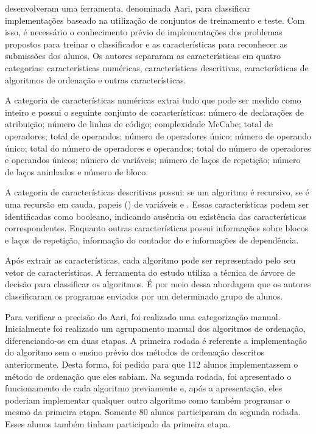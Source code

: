 		 desenvolveram uma ferramenta, denominada Aari,
		para classificar implementações baseado na utilização de conjuntos de treinamento
		e teste. Com isso, é necessário o conhecimento prévio de implementações dos
		problemas propostos para treinar o classificador e as características para
		reconhecer as submissões dos alunos. Os autores separaram as características
		em quatro categorias: características numéricas, características descritivas,
		características de algoritmos de ordenação e outras características.
		
		
		A categoria de características numéricas extrai tudo que pode ser medido
		como inteiro e possui o seguinte conjunto de características: número de
		declarações de atribuição; número de linhas de código; complexidade McCabe;
		total de operadores; total de operandos; número de operadores único; número
		de operando único; total do número de operadores e operandos; total do número
		de operadores e operandos únicos; número de variáveis; número de laços de
		repetição; número de laços aninhados e número de bloco.
		
		A categoria de características descritivas possui: se um algoritmo é
		recursivo, se é uma recursão em cauda, papeis () de variáveis
		e . Essas características podem ser identificadas como booleano,
		indicando ausência ou existência das características correspondentes. Enquanto
		outras características possui informações sobre blocos e laços de repetição,
		informação do contador do  e informações de dependência.
		
		Após extrair as características, cada algoritmo pode ser representado pelo seu
		vetor de características. A ferramenta do estudo utiliza a técnica de árvore
		de decisão para classificar os algoritmos. É por meio dessa abordagem que os
		autores classificaram os programas enviados por um determinado grupo de alunos.
		
		Para verificar a precisão do Aari, foi realizado uma categorização manual.
		Inicialmente foi realizado um agrupamento manual dos algoritmos de ordenação,
		diferenciando-os em duas etapas. A primeira rodada é referente a implementação
		do algoritmo sem o ensino prévio dos métodos de ordenação descritos
		anteriormente. Desta forma, foi pedido para que 112 alunos implementassem o
		método de ordenação que eles sabiam. Na segunda rodada, foi apresentado
		o funcionamento de cada algoritmo previamente e, após a apresentação, eles
		poderiam implementar qualquer outro algoritmo como também programar o mesmo
		da primeira etapa. Somente 80 alunos participaram da segunda rodada. Esses
		alunos também tinham participado da primeira etapa.
		
